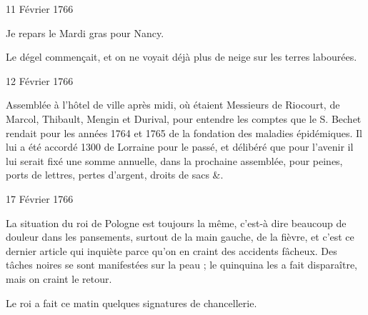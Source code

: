                      \begin{diary}{11 Février 1766}{}

                         Je repars le Mardi gras pour Nancy. \bigskip


                         Le dégel commençait, et on ne
                           voyait
                           déjà plus de neige sur les terres labourées. \bigskip


                     \end{diary}

                     \begin{diary}{12 Février 1766}{}

                         Assemblée à l'hôtel de ville après midi,
                           où étaient Messieurs
                           de Riocourt, de Marcol,
                           Thibault, Mengin et Durival, pour
                           entendre les comptes que le S.
                              Bechet rendait
                           pour les années 1764 et 1765 de la
                              fondation des maladies épidémiques.
                           Il lui a été accordé
                           1300 de Lorraine
                           pour le passé, et délibéré que pour
                           l'avenir il lui serait fixé une somme
                           annuelle, dans la prochaine assemblée,
                           pour peines, ports de lettres, pertes
                           d'argent, droits de sacs \&. \bigskip


                     \end{diary}



                     \begin{diary}{17 Février 1766}{}

                         La situation du roi de Pologne est toujours la
                           même, c'est-à dire beaucoup de douleur dans
                           les pansements, surtout de la main gauche,
                           de la fièvre, et c'est ce dernier article qui
                           inquiète parce qu'on en craint des accidents
                           fâcheux. Des tâches noires se sont manifestées
                           sur la peau ; le quinquina
                           les a fait
                           disparaître, mais on craint le retour. \bigskip



                           Le roi a fait ce matin quelques
                           signatures
                           de chancellerie. \bigskip


                     \end{diary}

